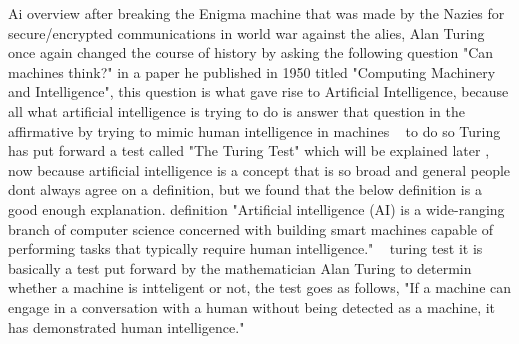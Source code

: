 Ai
    overview
        after breaking the Enigma machine that was made by the Nazies for secure/encrypted communications in world war against the alies, Alan Turing once again changed the course of history by asking the following question "Can machines think?" in a paper he published in 1950 titled "Computing Machinery and Intelligence", this question is what gave rise to Artificial Intelligence, because all what artificial intelligence is trying to do is answer that question in the affirmative by trying to mimic human intelligence in machines ~\cite{ai} to do so Turing has put forward a test called "The Turing Test" which will be explained later , now because artificial intelligence is a concept that is  so broad and general people dont always agree on a definition, but we found that the below definition is a good enough explanation.
    definition
        "Artificial intelligence (AI) is a wide-ranging branch of computer science concerned with building smart machines capable of performing tasks that typically require human intelligence." ~\cite{ai}
    turing test
        it is basically a test put forward by the mathematician Alan Turing to determin whether a machine is intteligent or not, the test goes as follows, "If a machine can engage in a conversation with a human without being detected as a machine, it has demonstrated human intelligence." ~\cite{turing}
    
